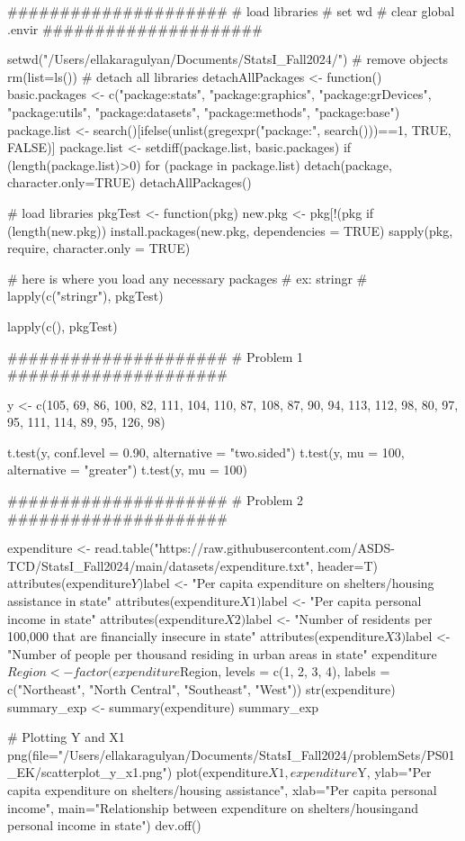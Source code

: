 #####################
# load libraries
# set wd
# clear global .envir
#####################

setwd("/Users/ellakaragulyan/Documents/StatsI_Fall2024/")
# remove objects
rm(list=ls())
# detach all libraries
detachAllPackages <- function() {
  basic.packages <- c("package:stats", "package:graphics", "package:grDevices", "package:utils", "package:datasets", "package:methods", "package:base")
  package.list <- search()[ifelse(unlist(gregexpr("package:", search()))==1, TRUE, FALSE)]
  package.list <- setdiff(package.list, basic.packages)
  if (length(package.list)>0)  for (package in package.list) detach(package,  character.only=TRUE)
}
detachAllPackages()

# load libraries
pkgTest <- function(pkg){
  new.pkg <- pkg[!(pkg %
  if (length(new.pkg)) 
    install.packages(new.pkg,  dependencies = TRUE)
  sapply(pkg,  require,  character.only = TRUE)
}

# here is where you load any necessary packages
# ex: stringr
# lapply(c("stringr"),  pkgTest)

lapply(c(),  pkgTest)

#####################
# Problem 1
#####################

y <- c(105, 69, 86, 100, 82, 111, 104, 110, 87, 108, 87, 90, 94, 113, 112, 98, 80, 97, 95, 111, 114, 89, 95, 126, 98)

t.test(y, conf.level = 0.90, alternative = "two.sided")
t.test(y, mu = 100, alternative = "greater")
t.test(y, mu = 100)

#####################
# Problem 2
#####################

expenditure <- read.table("https://raw.githubusercontent.com/ASDS-TCD/StatsI_Fall2024/main/datasets/expenditure.txt", header=T)
	attributes(expenditure$Y)$label <- "Per capita expenditure on shelters/housing assistance in state"
	attributes(expenditure$X1)$label <- "Per capita personal income in state"
	attributes(expenditure$X2)$label <- "Number of residents per 100,000 that are financially insecure in state"
	attributes(expenditure$X3)$label <- "Number of people per thousand residing in urban areas in state"
	expenditure$Region <- factor(expenditure$Region, 
            levels = c(1, 2, 3, 4), 
            labels = c("Northeast", "North Central", "Southeast", "West"))
str(expenditure)
summary_exp <- summary(expenditure)
summary_exp


# Plotting Y and X1
png(file="/Users/ellakaragulyan/Documents/StatsI_Fall2024/problemSets/PS01_EK/scatterplot_y_x1.png")
plot(expenditure$X1, expenditure$Y,
     ylab="Per capita expenditure on shelters/housing assistance",
     xlab="Per capita personal income",
     main="Relationship between expenditure on shelters/housing\nassistance and personal income in state")
dev.off()

